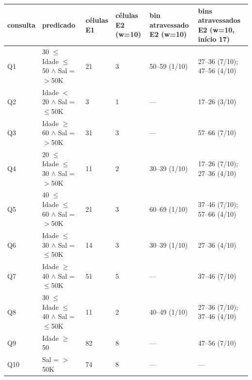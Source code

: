 \begin{tabular}{llllll}
\toprule
consulta & predicado & células E1 & células E2 (w=10) & bin atravessado E2 (w=10) & bins atravessados E2 (w=10, início 17) \\
\midrule
Q1 & 30 $\leq$ Idade $\leq$ 50 $\wedge$ Sal = $>$50K & 21 & 3 & 50–59 (1/10) & 27–36 (7/10); 47–56 (4/10) \\
Q2 & Idade $<$ 20 $\wedge$ Sal = $\leq$50K & 3 & 1 & --- & 17–26 (3/10) \\
Q3 & Idade $\geq$ 60 $\wedge$ Sal = $>$50K & 31 & 3 & --- & 57–66 (7/10) \\
Q4 & 20 $\leq$ Idade $\leq$ 30 $\wedge$ Sal = $>$50K & 11 & 2 & 30–39 (1/10) & 17–26 (7/10); 27–36 (4/10) \\
Q5 & 40 $\leq$ Idade $\leq$ 60 $\wedge$ Sal = $>$50K & 21 & 3 & 60–69 (1/10) & 37–46 (7/10); 57–66 (4/10) \\
Q6 & Idade $\leq$ 30 $\wedge$ Sal = $\leq$50K & 14 & 3 & 30–39 (1/10) & 27–36 (4/10) \\
Q7 & Idade $\geq$ 40 $\wedge$ Sal = $\leq$50K & 51 & 5 & --- & 37–46 (7/10) \\
Q8 & 30 $\leq$ Idade $\leq$ 40 $\wedge$ Sal = $\leq$50K & 11 & 2 & 40–49 (1/10) & 27–36 (7/10); 37–46 (4/10) \\
Q9 & Idade $\geq$ 50 & 82 & 8 & --- & 47–56 (7/10) \\
Q10 & Sal = $>$50K & 74 & 8 & --- & --- \\
\bottomrule
\end{tabular}
